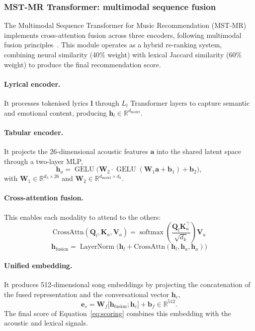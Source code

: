 \documentclass[]{ceurart}
\newcommand{\vect}[1]{\boldsymbol{#1}}
\newcommand{\mat}[1]{\mathbf{#1}}
\newcommand{\Real}{\mathbb{R}}
\newcommand{\softmax}{\operatorname{softmax}}
\newcommand{\LayerNorm}{\operatorname{LayerNorm}}
\newcommand{\GELU}{\operatorname{GELU}}
\begin{document}
\subsubsection{MST-MR Transformer: multimodal sequence fusion}
The Multimodal Sequence Transformer for Music Recommendation (MST-MR)
implements cross-attention fusion across three encoders, following multimodal
fusion principles~\cite{lu2019vilbert,tan2019lxmert}. This module operates as a
hybrid re-ranking system, combining neural similarity (40\% weight) with
lexical Jaccard similarity (60\% weight) to produce the final recommendation
score.

\paragraph{Lyrical encoder.}
It processes tokenised lyrics $\vect{l}$ through $L_l$ Transformer layers to
capture semantic and emotional content, producing $\vect{h}_l \in
\Real^{d_{\text{model}}}$.

\paragraph{Tabular encoder.}
It projects the 26-dimensional acoustic features $\vect{a}$ into the shared
latent space through a two-layer MLP,
\begin{equation}
\vect{h}_a = \GELU\bigl(\mat{W}_2 \cdot \GELU(\mat{W}_1 \vect{a} + \vect{b}_1)
  + \vect{b}_2\bigr),
\label{eq:tabular}
\end{equation}
with $\mat{W}_1 \in \Real^{d_h \times 26}$ and $\mat{W}_2 \in
\Real^{d_{\text{model}} \times d_h}$.

\paragraph{Cross-attention fusion.}
This enables each modality to attend to the others:
\begin{equation}
\text{CrossAttn}(\mat{Q}_l, \mat{K}_a, \mat{V}_a)
  = \softmax\left(\frac{\mat{Q}_l \mat{K}_a^\top}{\sqrt{d_k}}\right)\mat{V}_a
\label{eq:crossattn}
\end{equation}
\begin{equation}
\vect{h}_{\text{fusion}}
  = \LayerNorm\bigl(\vect{h}_l + \text{CrossAttn}(\vect{h}_l, \vect{h}_a,
  \vect{h}_a)\bigr)
\label{eq:fusion}
\end{equation}

\paragraph{Unified embedding.}
It produces 512-dimensional song embeddings by projecting the concatenation of
the fused representation and the conversational vector $\vect{h}_c$,
\begin{equation}
\vect{e}_s = \mat{W}_f \bigl[\vect{h}_{\text{fusion}}; \vect{h}_c\bigr]
  + \vect{b}_f \in \Real^{512}.
\label{eq:unified}
\end{equation}
The final score of Equation~\eqref{eq:scoring} combines this embedding with the
acoustic and lexical signals.
\end{document}

